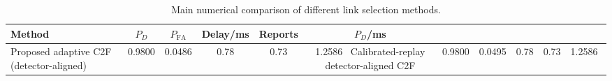 \begin{table}[t]
    \centering
    \caption{Main numerical comparison of different link selection methods.}
    \label{tab:main_summary}
    \begin{tabular}{l c c c c c}
        \hline
        Method & $P_D$ & $P_{\mathrm{FA}}$ & Delay/ms & Reports & $P_D$/ms \\
        \hline
        Proposed adaptive C2F (detector-aligned) & 0.9800 & 0.0486 & 0.78 & 0.73 & 1.2586 \
        Calibrated-replay detector-aligned C2F & 0.9800 & 0.0495 & 0.78 & 0.73 & 1.2586 \
        \hline
    \end{tabular}
\end{table}
